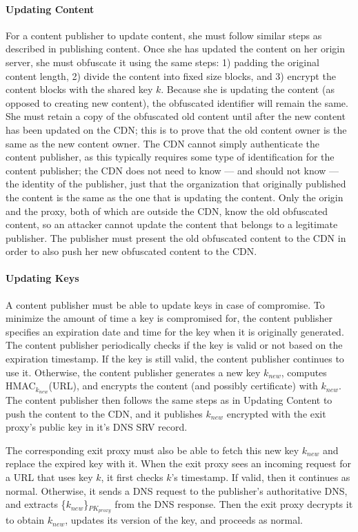 \paragraph{Updating Content}
For a content publisher to update content, she must follow similar steps as described in publishing content.  
Once she has updated the content on her origin server, she must obfuscate it using the same steps: 1) padding the 
original content length, 2) divide the content into fixed size blocks, and 3) encrypt the content blocks 
with the shared key $k$.  Because she is updating the content (as opposed to creating new content), the 
obfuscated identifier will remain the same.  She must 
retain a copy of the obfuscated old content until after the new content has been updated on the CDN; this is to prove 
that the old content owner is the same as the new content owner.  The CDN cannot simply authenticate the content publisher, as this 
typically requires some type of identification for the content publisher; the CDN does not need to know --- and should not know --- 
the identity of the publisher, just that the organization that originally published the content is the same as the one that is 
updating the content.  Only the origin and the proxy, both of which are 
outside the CDN, know the old obfuscated content, so an attacker cannot update the content that belongs to 
a legitimate publisher.  The publisher must present the old obfuscated content to the CDN in order to also push 
her new obfuscated content to the CDN. 

\paragraph{Updating Keys}
A content publisher must be able to update keys in case of compromise.  To minimize the amount of time a key is compromised for, the 
content publisher specifies an expiration date and time for the key when it is originally generated.  The content publisher 
periodically checks if the key is valid or not based on the expiration timestamp.  If the key is still valid, the content publisher 
continues to use it.  Otherwise, the content publisher generates a new key $k_{new}$, computes HMAC$_{k_{new}}$(URL), and 
encrypts the content (and possibly certificate) with $k_{new}$.  The content publisher then follows the same steps as in Updating 
Content to push the content to the CDN, and it publishes $k_{new}$ encrypted with the exit proxy's public key in it's DNS SRV record.

The corresponding exit proxy must also be able to fetch this new key $k_{new}$ and replace the expired key with it.  When the exit proxy 
sees an incoming request for a URL that uses key $k$, it first checks $k$'s timestamp.  If valid, then it continues as normal.  Otherwise, 
it sends a DNS request to the publisher's authoritative DNS, and extracts \{$k_{new}$\}$_{PK_{proxy}}$ from the DNS response.  Then the exit 
proxy decrypts it to obtain $k_{new}$, updates its version of the key, and proceeds as normal.

